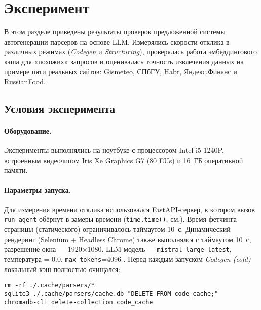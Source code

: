 \section{Эксперимент}
\label{subsec:results}

В этом разделе приведены результаты проверок предложенной системы автогенерации парсеров на основе LLM. Измерялись скорости отклика в различных режимах (\emph{Codegen} и \emph{Structuring}), проверялась работа эмбеддингового кэша для «похожих» запросов и оценивалась точность извлечения данных на примере пяти реальных сайтов: Gismeteo, СПбГУ, Habr, Яндекс.Финанс и RussianFood.

\subsection{Условия эксперимента}

\paragraph{Оборудование.}
Эксперименты выполнялись на ноутбуке с процессором Intel i5-1240P, встроенным видеочипом Iris Xe Graphics G7 (80 EUs) и 16~ГБ оперативной памяти.

\paragraph{Параметры запуска.}
Для измерения времени отклика использовался FastAPI-сервер, в котором вызов \texttt{run\_agent} обёрнут в замеры времени (\texttt{time.time()}, см.\cite{FastAPIDocumentation}). Время фетчинга страницы (статического) ограничивалось таймаутом 10~с. Динамический рендеринг (Selenium + Headless Chrome) также выполнялся с таймаутом 10~с, разрешение окна — 1920×1080\cite{SeleniumDocumentation}. LLM-модель — \texttt{mistral-large-latest}, температура = 0.0, \texttt{max\_tokens}=4096 \cite{MistralAIDocumentation, TiktokenDocumentation}. Перед каждым запуском \emph{Codegen (cold)} локальный кэш полностью очищался:
\begin{verbatim}
rm -rf ./.cache/parsers/*
sqlite3 ./.cache/parsers/cache.db "DELETE FROM code_cache;"
chromadb-cli delete-collection code_cache
\end{verbatim}

